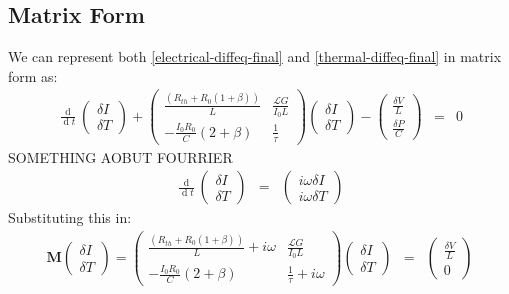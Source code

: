 \documentclass[letterpaper,10pt]{article}
\begin{document}
\subsection{Matrix Form}
We can represent both \eqref{electrical-diffeq-final} and \eqref{thermal-diffeq-final} in matrix form as:
\begin{eqnarray}
	\frac{\operatorname{d}}{\operatorname{d}t} 
		\begin{pmatrix}
			\delta I \\
			\delta T			
		\end{pmatrix}
	+
	\begin{pmatrix}
		\frac{\left(R_{th} + R_0 ( 1 + \beta ) \right)}{L} & \frac{\mathcal{L} G}{I_0 L} \\
		- \frac{I_0 R_0}{C} (2 + \beta) & \frac{1}{\tau}
	\end{pmatrix}
	\begin{pmatrix}
		\delta I \\
		\delta T
	\end{pmatrix}
	-
	\begin{pmatrix}
		\frac{\delta V}{L} \\
		\frac{\delta P}{C}
	\end{pmatrix}
	&=& 0
\end{eqnarray}
SOMETHING AOBUT FOURRIER
\begin{eqnarray}
	\frac{\operatorname{d}}{\operatorname{d}t} 
		\begin{pmatrix}
			\delta I \\
			\delta T			
		\end{pmatrix}
	&=&
	\begin{pmatrix}
			i \omega \delta I \\
			i \omega \delta T			
	\end{pmatrix}
\end{eqnarray}
Substituting this in:
\begin{eqnarray}
	\mathbf{M}
	\begin{pmatrix}
		\delta I \\
		\delta T
	\end{pmatrix}
	=
	\begin{pmatrix}
		\frac{\left(R_{th} + R_0 ( 1 + \beta ) \right)}{L} + i\omega & \frac{\mathcal{L} G}{I_0 L} \\
		- \frac{I_0 R_0}{C} (2 + \beta) & \frac{1}{\tau} + i\omega
	\end{pmatrix}
	\begin{pmatrix}
		\delta I \\
		\delta T
	\end{pmatrix}
	&=&
	\begin{pmatrix}
		\frac{\delta V}{L} \\
		0
	\end{pmatrix}
\end{eqnarray}
\end{document}
